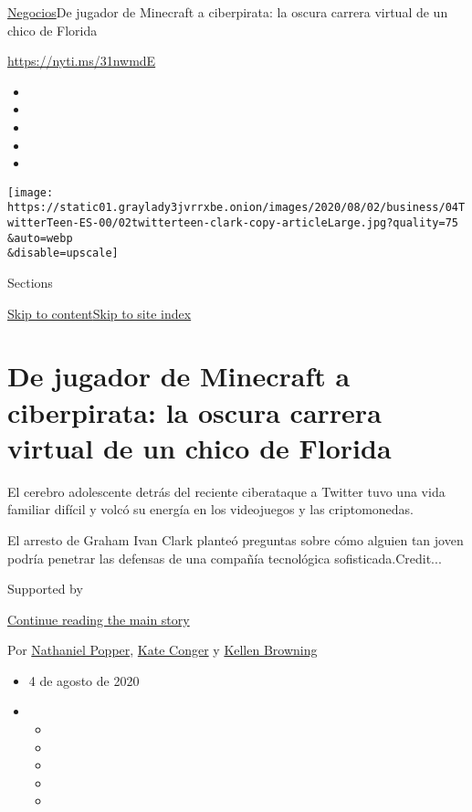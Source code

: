 \href{/es/section/negocios}{Negocios}\textbar{}De jugador de Minecraft a
ciberpirata: la oscura carrera virtual de un chico de Florida

\href{https://nyti.ms/31nwmdE}{https://nyti.ms/31nwmdE}

\begin{itemize}
\item
\item
\item
\item
\item
\end{itemize}

\texttt{[image: https://static01.graylady3jvrrxbe.onion/images/2020/08/02/business/04TwitterTeen-ES-00/02twitterteen-clark-copy-articleLarge.jpg?quality=75\\\&auto=webp\\\&disable=upscale]}

Sections

\protect\hyperlink{site-content}{Skip to
content}\protect\hyperlink{site-index}{Skip to site index}

\hypertarget{de-jugador-de-minecraft-a-ciberpirata-la-oscura-carrera-virtual-de-un-chico-de-florida}{%
\section{De jugador de Minecraft a ciberpirata: la oscura carrera
virtual de un chico de
Florida}\label{de-jugador-de-minecraft-a-ciberpirata-la-oscura-carrera-virtual-de-un-chico-de-florida}}

El cerebro adolescente detrás del reciente ciberataque a Twitter tuvo
una vida familiar difícil y volcó su energía en los videojuegos y las
criptomonedas.

El arresto de Graham Ivan Clark planteó preguntas sobre cómo alguien tan
joven podría penetrar las defensas de una compañía tecnológica
sofisticada.Credit...

Supported by

\protect\hyperlink{after-sponsor}{Continue reading the main story}

Por
\href{https://www.nytimes3xbfgragh.onion/by/nathaniel-popper}{Nathaniel
Popper}, \href{https://www.nytimes3xbfgragh.onion/by/kate-conger}{Kate
Conger} y
\href{https://www.nytimes3xbfgragh.onion/by/kellen-browning}{Kellen
Browning}

\begin{itemize}
\item
  4 de agosto de 2020
\item
  \begin{itemize}
  \item
  \item
  \item
  \item
  \item
  \end{itemize}
\end{itemize}

